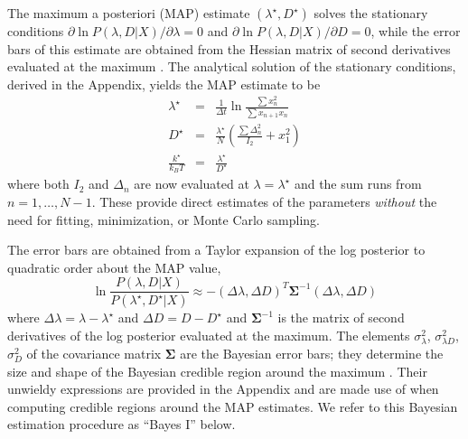 \documentclass[english,aps, twocolumn, pre,superscriptaddress]{revtex4-1}
\begin{document}
The maximum a posteriori (MAP) estimate $(\lambda^{\star},D^{\star})$
solves the stationary conditions $\partial\ln P(\lambda,D|X)/\partial\lambda=0$
and $\partial\ln P(\lambda,D|X)/\partial D=0$, while the error bars
of this estimate are obtained from the Hessian matrix of second derivatives
evaluated at the maximum \cite{jeffreys1998theory,jaynes2003probability,sivia2006data}.
The analytical solution of the stationary conditions, derived in the
Appendix, yields the MAP estimate to be\begin{subequations}\label{eq:map-estimate}
\begin{eqnarray}
\lambda^{\star} & = & \frac{1}{\Delta t}\ln\frac{\sum x_{n}^{2}}{\sum x_{n+1}x_{n}}\\
D^{\star} & = & \frac{\lambda^{\star}}{N}\left(\frac{\sum\Delta_{n}^{2}}{I_{2}}+x_{1}^{2}\right)\\
\frac{k^{\star}}{k_{B}T} & = & \frac{\lambda^{\star}}{D^{\star}}
\end{eqnarray}
\end{subequations}where both $I_{2}$ and $\Delta_{n}$ are now evaluated
at $\lambda=\lambda^{\star}$ and the sum runs from $n=1,\ldots,N-1$.
These provide direct estimates of the parameters \emph{without} the
need for fitting, minimization, or Monte Carlo sampling. 

The error bars are obtained from a Taylor expansion of the log posterior
to quadratic order about the MAP value,
\begin{equation}
\ln\frac{P(\lambda,D|X)}{P(\lambda^{\star},D^{\star}|X)}\approx-\left(\Delta\lambda,\Delta D\right)^{T}\mathbf{\boldsymbol{\Sigma}}^{-1}\left(\Delta\lambda,\Delta D\right)\label{eq:quadratic-form}
\end{equation}
where $\Delta\lambda=\lambda-\lambda^{\star}$ and $\Delta D=D-D^{\star}$
and $\boldsymbol{\Sigma}^{-1}$ is the matrix of second derivatives
of the log posterior evaluated at the maximum. The elements $\sigma_{\lambda}^{2}$,
$\sigma_{\lambda D}^{2}$, $\sigma_{D}^{2}$ of the covariance matrix
$\boldsymbol{\Sigma}$ are the Bayesian error bars; they determine
the size and shape of the Bayesian credible region around the maximum
\cite{sivia2006data}. Their unwieldy expressions are provided in
the Appendix and are made use of when computing credible regions around
the MAP estimates. We refer to this Bayesian estimation procedure
as ``Bayes I'' below. 
\end{document}
